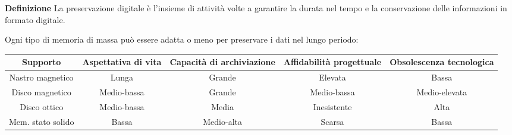 \documentclass{article}
\begin{document}
\noindent\textbf{Definizione} La preservazione digitale è l'insieme di attività volte a garantire la durata nel tempo e la conservazione delle informazioni in formato digitale.\newline

\noindent Ogni tipo di memoria di massa può essere adatta o meno per preservare i dati nel lungo periodo:


\begin{table}[H]
    \centering
    \begin{adjustwidth}{-3.5cm}{}
    \begin{tabular}{c|c|c|c|c}
        Supporto & Aspettativa di vita & Capacità di archiviazione & Affidabilità progettuale & Obsolescenza tecnologica\\
        \hline
        Nastro magnetico & Lunga & Grande & Elevata & Bassa \\
        \hline
        Disco magnetico & Medio-bassa & Grande & Medio-bassa & Medio-elevata \\
        \hline
        Disco ottico & Medio-bassa & Media & Inesistente & Alta \\
        \hline
        Mem. stato solido & Bassa & Medio-alta & Scarsa & Bassa \\
    \end{tabular}
    \end{adjustwidth}
    \label{tab:dp}
\end{table}
\end{document}
